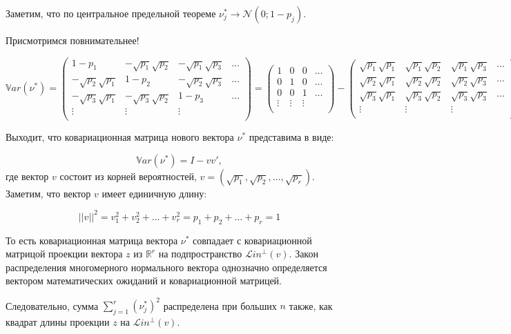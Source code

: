 \documentclass[11pt,russian,]{article}
\newcommand{\cN}{\mathcal{N}}
\newcommand{\RR}{\mathbb{R}}
\newcommand{\1}{\mathbbm{1}}
\newcommand{\Lin}{\mathcal{L}in}
\newcommand{\Linp}{\Lin^{\perp}}
\newcommand{\Var}{\mathbb{V}ar}
\begin{document}
Заметим, что по центральное предельной теореме
\(\nu_j^* \to \cN(0; 1 - p_j)\).

Присмотримся повнимательнее!

\[
\Var(\nu^*) = \begin{pmatrix}
1 - p_1 & -\sqrt{p_1}\sqrt{p_2} & -\sqrt{p_1}\sqrt{p_3} & \ldots \\
-\sqrt{p_2}\sqrt{p_1} & 1 - p_2 & -\sqrt{p_2}\sqrt{p_3} & \ldots \\
-\sqrt{p_3}\sqrt{p_1} & -\sqrt{p_3}\sqrt{p_2} & 1 - p_3  & \ldots \\
\vdots & \vdots & \vdots &  \\
\end{pmatrix} = 
\begin{pmatrix}
1 & 0 & 0 & \ldots \\
0 & 1 & 0 & \ldots \\
0 & 0 & 1 & \ldots \\
\vdots & \vdots & \vdots &  \\
\end{pmatrix} - \begin{pmatrix}
\sqrt{p_1}\sqrt{p_1} & \sqrt{p_1}\sqrt{p_2} & \sqrt{p_1}\sqrt{p_3} & \ldots \\
\sqrt{p_2}\sqrt{p_1} & \sqrt{p_2}\sqrt{p_2} & \sqrt{p_2}\sqrt{p_3} & \ldots \\
\sqrt{p_3}\sqrt{p_1} & \sqrt{p_3}\sqrt{p_2} & \sqrt{p_3}\sqrt{p_3}  & \ldots \\
\vdots & \vdots & \vdots &  \\
\end{pmatrix}
\]

Выходит, что ковариационная матрица нового вектора \(\nu^*\) представима
в виде:

\[
\Var(\nu^*) = I - vv',
\] где вектор \(v\) состоит из корней вероятностей,
\(v= (\sqrt{p_1}, \sqrt{p_2}, \ldots, \sqrt{p_r})\). Заметим, что вектор
\(v\) имеет единичную длину:

\[
||v||^2 = v_1^2 + v_2^2 + \ldots + v_r^2 = p_1 + p_2 + \ldots + p_r = 1
\]

То есть ковариационная матрица вектора \(\nu^*\) совпадает с
ковариационной матрицой проекции вектора \(z\) из \(\RR^r\) на
подпространство \(\Linp(v)\). Закон распределения многомерного
нормального вектора однозначно определяется вектором математических
ожиданий и ковариационной матрицей.

Следовательно, сумма \(\sum_{j=1}^r (\nu_j^*)^2\) распределена при
больших \(n\) также, как квадрат длины проекции \(z\) на \(\Linp(v)\).
\end{document}
